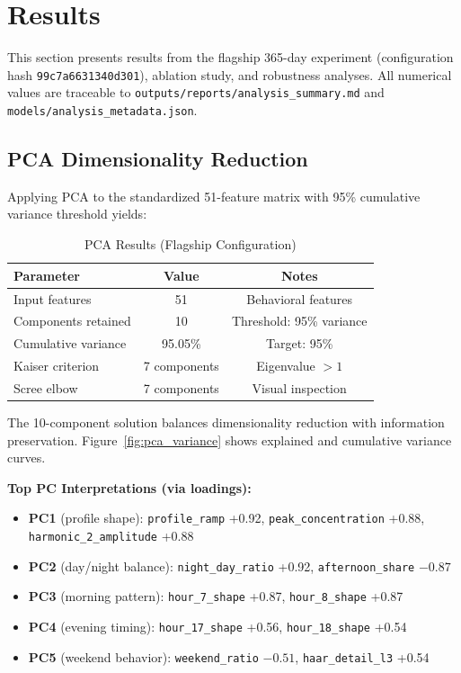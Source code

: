 \section{Results}
\label{sec:results}

This section presents results from the flagship 365-day experiment (configuration hash \texttt{99c7a6631340d301}), ablation study, and robustness analyses. All numerical values are traceable to \texttt{outputs/reports/analysis\_summary.md} and \texttt{models/analysis\_metadata.json}.

\subsection{PCA Dimensionality Reduction}

Applying PCA to the standardized 51-feature matrix with 95\% cumulative variance threshold yields:

\begin{table}[h]
\centering
\caption{PCA Results (Flagship Configuration)}
\label{tab:pca_results}
\begin{tabular}{@{}lcc@{}}
\toprule
Parameter & Value & Notes \\
\midrule
Input features & 51 & Behavioral features \\
Components retained & 10 & Threshold: 95\% variance \\
Cumulative variance & 95.05\% & Target: 95\% \\
Kaiser criterion & 7 components & Eigenvalue $> 1$ \\
Scree elbow & 7 components & Visual inspection \\
\bottomrule
\end{tabular}
\end{table}

The 10-component solution balances dimensionality reduction with information preservation. Figure~\ref{fig:pca_variance} shows explained and cumulative variance curves.

\textbf{Top PC Interpretations (via loadings):}
\begin{itemize}
    \item \textbf{PC1} (profile shape): \texttt{profile\_ramp} +0.92, \texttt{peak\_concentration} +0.88, \texttt{harmonic\_2\_amplitude} +0.88
    \item \textbf{PC2} (day/night balance): \texttt{night\_day\_ratio} +0.92, \texttt{afternoon\_share} $-0.87$
    \item \textbf{PC3} (morning pattern): \texttt{hour\_7\_shape} +0.87, \texttt{hour\_8\_shape} +0.87
    \item \textbf{PC4} (evening timing): \texttt{hour\_17\_shape} +0.56, \texttt{hour\_18\_shape} +0.54
    \item \textbf{PC5} (weekend behavior): \texttt{weekend\_ratio} $-0.51$, \texttt{haar\_detail\_l3} +0.54
\end{itemize}

